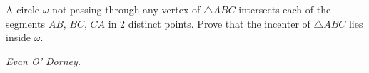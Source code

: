 A circle $\omega$ not passing through any vertex of $\triangle ABC$ intersects each of the segments $AB$, $BC$, $CA$ in 2 distinct points. Prove that the incenter of $\triangle ABC$ lies inside $\omega$.

\textit{Evan O' Dorney.}